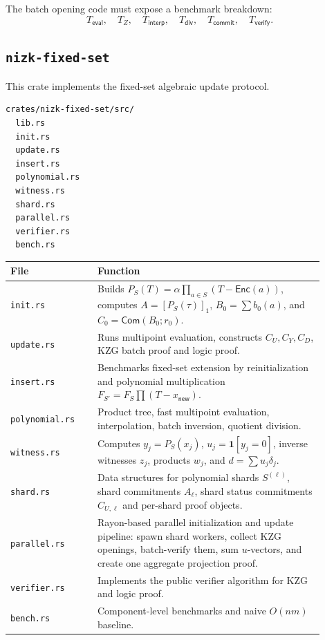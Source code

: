 \documentclass[UTF8,a4paper,11pt]{ctexart}
\newcommand{\Com}{\mathsf{Com}}
\newcommand{\Enc}{\mathsf{Enc}}
\begin{document}
The batch opening code must expose a benchmark breakdown:
\[
  T_{\mathsf{eval}},\quad T_{Z},\quad T_{\mathsf{interp}},\quad T_{\mathsf{div}},\quad T_{\mathsf{commit}},\quad T_{\mathsf{verify}}.
\]

\subsection{\texttt{nizk-fixed-set}}

This crate implements the fixed-set algebraic update protocol.

\begin{lstlisting}
crates/nizk-fixed-set/src/
  lib.rs
  init.rs
  update.rs
  insert.rs
  polynomial.rs
  witness.rs
  shard.rs
  parallel.rs
  verifier.rs
  bench.rs
\end{lstlisting}

\begin{longtable}{p{0.25\linewidth}p{0.65\linewidth}}
\toprule
File & Function \\
\midrule
\texttt{init.rs} & Builds $P_S(T)=\alpha\prod_{a\in S}(T-\Enc(a))$, computes $A=[P_S(\tau)]_1$, $B_0=\sum b_0(a)$, and $C_0=\Com(B_0;r_0)$. \\
\texttt{update.rs} & Runs multipoint evaluation, constructs $C_U,C_Y,C_D$, KZG batch proof and logic proof. \\
\texttt{insert.rs} & Benchmarks fixed-set extension by reinitialization and polynomial multiplication $F_{S'}=F_S\prod(T-x_{\mathsf{new}})$. \\
\texttt{polynomial.rs} & Product tree, fast multipoint evaluation, interpolation, batch inversion, quotient division. \\
\texttt{witness.rs} & Computes $y_j=P_S(x_j)$, $u_j=\mathbf 1[y_j=0]$, inverse witnesses $z_j$, products $w_j$, and $d=\sum u_j\delta_j$. \\
\texttt{shard.rs} & Data structures for polynomial shards $S^{(\ell)}$, shard commitments $A_\ell$, shard status commitments $C_{U,\ell}$ and per-shard proof objects. \\
\texttt{parallel.rs} & Rayon-based parallel initialization and update pipeline: spawn shard workers, collect KZG openings, batch-verify them, sum $u$-vectors, and create one aggregate projection proof. \\
\texttt{verifier.rs} & Implements the public verifier algorithm for KZG and logic proof. \\
\texttt{bench.rs} & Component-level benchmarks and naive $O(nm)$ baseline. \\
\bottomrule
\end{longtable}
\end{document}
